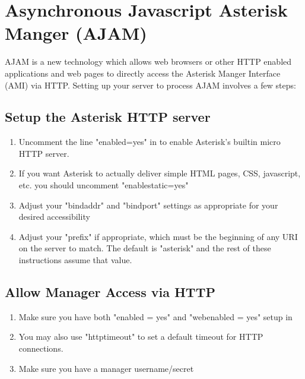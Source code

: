 \section{Asynchronous Javascript Asterisk Manger (AJAM)}

AJAM is a new technology which allows web browsers or other HTTP enabled
applications and web pages to directly access the Asterisk Manger
Interface (AMI) via HTTP.  Setting up your server to process AJAM
involves a few steps:

\subsection{Setup the Asterisk HTTP server}

\begin{enumerate}
\item Uncomment the line "enabled=yes" in  to enable
   Asterisk's builtin micro HTTP server.

\item If you want Asterisk to actually deliver simple HTML pages, CSS,
   javascript, etc. you should uncomment "enablestatic=yes"

\item Adjust your "bindaddr" and "bindport" settings as appropriate for
   your desired accessibility

\item Adjust your "prefix" if appropriate, which must be the beginning of
   any URI on the server to match.  The default is "asterisk" and the
   rest of these instructions assume that value.
\end{enumerate}

\subsection{Allow Manager Access via HTTP}

\begin{enumerate}
\item Make sure you have both "enabled = yes" and "webenabled = yes" setup
   in 

\item You may also use "httptimeout" to set a default timeout for HTTP
   connections.

\item Make sure you have a manager username/secret
\end{enumerate}

